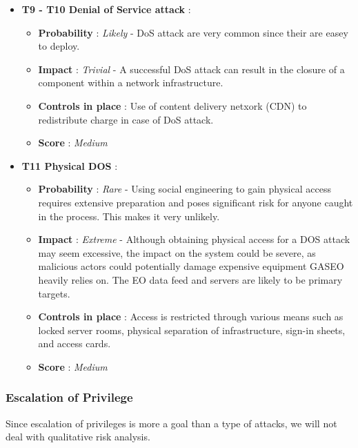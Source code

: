 \documentclass[12pt]{article}
\begin{document}
\begin{itemize}
    \item \textbf{ T9 - T10 Denial of Service attack }:
        \begin{itemize}
                \item  \textbf{ Probability }: \textit{Likely} - DoS attack are very common since their are easey to deploy.
                \item  \textbf{ Impact }:  \textit{Trivial} -  A successful DoS attack can result in the closure of a component within a network infrastructure.
                \item \textbf{ Controls in place }: Use of content delivery netxork (CDN) to redistribute charge in case of DoS attack.
                \item \textbf{ Score } : \textit{Medium}
        \end{itemize}
    
    \item \textbf{ T11 Physical DOS }: 
         \begin{itemize}
                \item  \textbf{ Probability }: \textit{Rare} - Using social engineering to gain physical access requires extensive preparation and poses significant risk for anyone caught in the process. This makes it very  unlikely.
                \item  \textbf{ Impact }:  \textit{Extreme} -  Although obtaining physical access for a DOS attack may seem excessive, the impact on the system could be severe, as malicious actors could potentially damage expensive equipment GASEO heavily relies on. The EO data feed and servers are likely to be primary targets.
                \item \textbf{ Controls in place }: Access is restricted through various means such as locked server rooms, physical separation of infrastructure, sign-in sheets, and access cards.
                \item \textbf{ Score } : \textit{Medium}
        \end{itemize}
\end{itemize}

\subsubsection*{Escalation of Privilege}
Since escalation of privileges is more a goal than a type of attacks, we will not deal with qualitative risk analysis.
\end{document}
